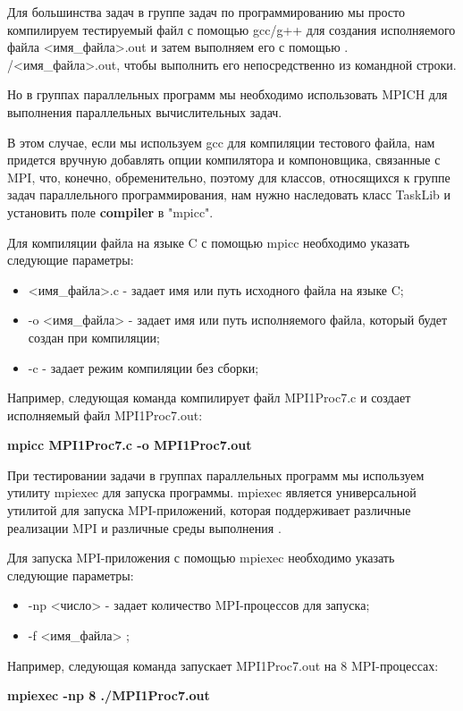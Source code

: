 Для большинства задач в группе задач по программированию мы просто компилируем тестируемый файл с помощью gcc/g++ для создания 
исполняемого файла <имя\_файла>.out и затем выполняем его с помощью . /<имя\_файла>.out, чтобы выполнить его непосредственно из командной строки.

Но в группах параллельных программ мы необходимо использовать MPICH для выполнения параллельных вычислительных задач. 

В этом случае, если мы используем gcc для компиляции тестового файла, нам придется 
вручную добавлять опции компилятора и компоновщика, связанные с MPI, что, конечно, 
обременительно, поэтому для классов, относящихся к группе задач параллельного 
программирования, нам нужно наследовать класс TaskLib и установить поле \textbf{compiler} в "mpicc".

 Для компиляции файла на языке C с помощью mpicc необходимо указать следующие параметры:

\begin{itemize}
	\item <имя\_файла>.c - задает имя или путь исходного файла на языке C;
	\item -o <имя\_файла> - задает имя или путь исполняемого файла, который будет создан при компиляции;
	\item -c - задает режим компиляции без сборки;
\end{itemize}

 
 Например, следующая команда компилирует файл MPI1Proc7.c и создает исполняемый файл MPI1Proc7.out:
 
 \centerline{\textbf{mpicc MPI1Proc7.c -o MPI1Proc7.out}}

При тестировании задачи в группах параллельных программ мы используем утилиту mpiexec 
для запуска программы. mpiexec является универсальной утилитой для запуска 
MPI-приложений, которая поддерживает различные реализации MPI и различные среды выполнения \cite{ref6}.

Для запуска MPI-приложения с помощью mpiexec необходимо указать следующие параметры:

\begin{itemize}
	\item -np <число> - задает количество MPI-процессов для запуска;
	\item -f <имя\_файла> ;
\end{itemize}

Например, следующая команда запускает MPI1Proc7.out на 8 MPI-процессах:

\centerline{\textbf{mpiexec -np 8 ./MPI1Proc7.out}} 

